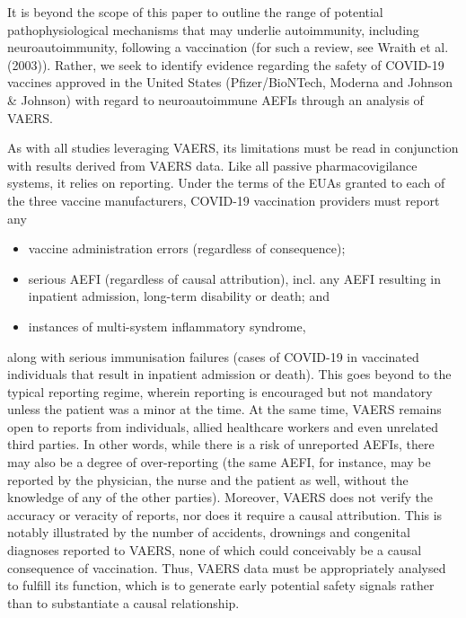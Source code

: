 \documentclass[idr,communication,submit,oneauthor,pdftex]{Definitions/mdpi}
\begin{document}
It is beyond the scope of this paper to outline the range of potential pathophysiological mechanisms that may underlie
autoimmunity, including neuroautoimmunity, following a vaccination (for such a review, see Wraith et al.
(2003)\cite{wraith2003vaccination}). Rather, we seek to identify evidence regarding the safety of COVID-19 vaccines
approved in the United States (Pfizer/BioNTech, Moderna and Johnson \& Johnson) with regard to neuroautoimmune AEFIs
through an analysis of VAERS.

As with all studies leveraging VAERS, its limitations must be read in conjunction with results derived from VAERS data. Like
all passive pharmacovigilance systems, it relies on reporting. Under the terms of the EUAs granted to each of the three
vaccine manufacturers, COVID-19 vaccination providers must report any

\begin{itemize}
\item	vaccine administration errors (regardless of consequence);
\item	serious AEFI (regardless of causal attribution), incl. any AEFI resulting in inpatient admission, long-term
disability or death; and
\item	instances of multi-system inflammatory syndrome,
\end{itemize}

\noindent along with serious immunisation failures (cases of COVID-19 in vaccinated individuals that result in
inpatient admission or death). This goes beyond to the typical reporting regime, wherein reporting is encouraged but
not mandatory unless the patient was a minor at the time. At the same time, VAERS remains open to reports from
individuals, allied healthcare workers and even unrelated third
parties.\cite{chen1994vaccine,shimabukuro2015safety,singleton1999overview} In other words, while there is a risk of unreported AEFIs, there may also 
be a degree of over-reporting (the same AEFI, for instance, may be 
reported by the physician, the nurse and the patient as well, without the 
knowledge of any of the other parties). Moreover, VAERS does
not verify the accuracy or veracity of reports, nor does it require a 
causal attribution. This is notably illustrated by the number of 
accidents, drownings and congenital diagnoses reported to VAERS, none of 
which could conceivably be a causal consequence of vaccination. Thus, 
VAERS data must be appropriately analysed to fulfill its function, which 
is to generate early potential safety signals rather than to substantiate 
a causal relationship.
\end{document}
